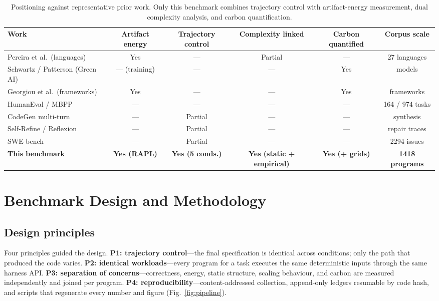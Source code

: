 \documentclass[journal]{IEEEtran}
\begin{document}
\begin{table}[htbp]
\caption{Positioning against representative prior work. Only this benchmark
combines trajectory control with artifact-energy measurement, dual
complexity analysis, and carbon quantification.}
\label{tab:position}
\centering
\begin{tabular}{lccccc}
\toprule
Work & Artifact energy & Trajectory control & Complexity linked & Carbon quantified & Corpus scale \\
\midrule
Pereira et al.\ (languages)~\cite{pereira2017} & Yes & --- & Partial & --- & 27 languages \\
Schwartz / Patterson (Green AI)~\cite{schwartz2020, patterson2021} & --- (training) & --- & --- & Yes & models \\
Georgiou et al.\ (frameworks)~\cite{georgiou2022} & Yes & --- & --- & Yes & frameworks \\
HumanEval / MBPP~\cite{chen2021, austin2021} & --- & --- & --- & --- & 164 / 974 tasks \\
CodeGen multi-turn~\cite{nijkamp2023} & --- & Partial & --- & --- & synthesis \\
Self-Refine / Reflexion~\cite{madaan2023, shinn2023} & --- & Partial & --- & --- & repair traces \\
SWE-bench~\cite{jimenez2024} & --- & Partial & --- & --- & 2294 issues \\
\textbf{This benchmark} & \textbf{Yes (RAPL)} & \textbf{Yes (5 conds.)} &
\textbf{Yes (static + empirical)} & \textbf{Yes (+ grids)} &
\textbf{1418 programs} \\
\bottomrule
\end{tabular}
\end{table}

\section{Benchmark Design and Methodology}\label{sec:method}
\subsection{Design principles}
Four principles guided the design. \textbf{P1: trajectory control}---the
final specification is identical across conditions; only the path that
produced the code varies. \textbf{P2: identical workloads}---every program
for a task executes the same deterministic inputs through the same harness
API. \textbf{P3: separation of concerns}---correctness, energy, static
structure, scaling behaviour, and carbon are measured independently and
joined per program. \textbf{P4: reproducibility}---content-addressed
collection, append-only ledgers resumable by code hash, and scripts that
regenerate every number and figure (Fig.~\ref{fig:pipeline}).
\end{document}
